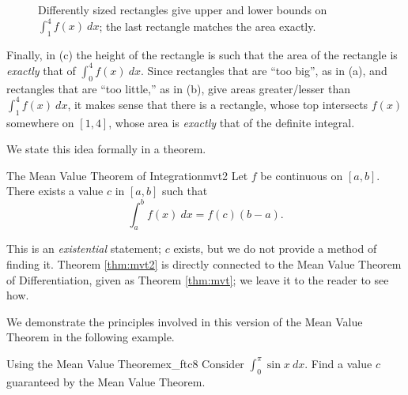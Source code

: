 \begin{figure}[H]
\begin{subfigure}{.33\textwidth}

\caption{}
  \label{fig:ftc7c}
\end{subfigure}%
\caption{Differently sized rectangles give upper and lower bounds on $\int_1^4 f(x)\ dx$; the last rectangle matches the area exactly.\label{fig:ftc7}} 
\end{figure}


Finally, in (c) the height of the rectangle is such that the area of the rectangle is \textit{exactly} that of $\int_0^4 f(x)\ dx$. Since rectangles that are ``too big\primeskip'', as in (a), and rectangles that are ``too little,'' as in (b), give areas greater/lesser than $\int_1^4 f(x)\ dx$, it makes sense that there is a rectangle, whose top intersects $f(x)$ somewhere on $[1,4]$, whose area is \textit{exactly} that of the definite integral.


We state this idea formally in a theorem.

\begin{theorem}{The Mean Value Theorem of Integration}{mvt2}
{Let $f$ be continuous on $[a,b]$. There exists a value $c$ in $[a,b]$ such that $$\int_a^bf(x)\ dx = f(c)(b-a).$$
}
\end{theorem}

This is an \emph{existential} statement; $c$ exists, but we do not provide a method of finding it. Theorem \ref{thm:mvt2} is directly connected to the Mean Value Theorem of Differentiation, given %
as Theorem \ref{thm:mvt}; we leave it to the reader to see how.

We demonstrate the principles involved in this version of the Mean Value Theorem in the following example.\\


\begin{example}{Using the Mean Value Theorem}{ex_ftc8}
{
Consider $\int_0^\pi \sin x\ dx$. Find a value $c$ guaranteed by the Mean Value Theorem.
}
\end{example}

